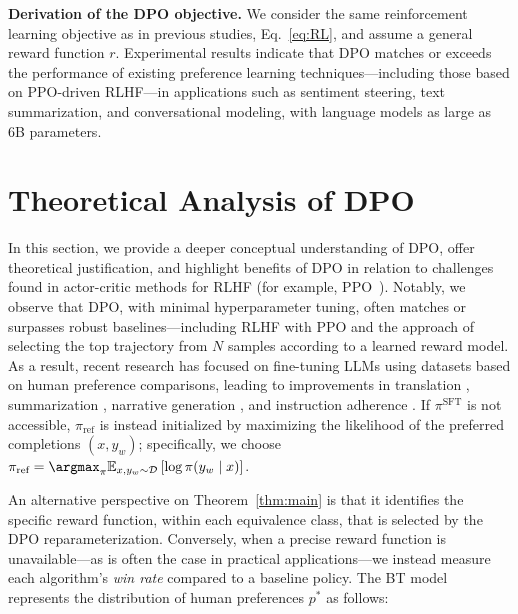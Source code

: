 \begin{lemma}
\begin{sproof}
\textbf{Derivation of the DPO objective.} We consider the same reinforcement learning objective as in previous studies, Eq.~\ref{eq:RL}, and assume a general reward function $r$. Experimental results indicate that DPO matches or exceeds the performance of existing preference learning techniques—including those based on PPO-driven RLHF—in applications such as sentiment steering, text summarization, and conversational modeling, with language models as large as 6B parameters. \section{Theoretical Analysis of DPO} In this section, we provide a deeper conceptual understanding of DPO, offer theoretical justification, and highlight benefits of DPO in relation to challenges found in actor-critic methods for RLHF (for example, PPO~\cite{schulman2017proximal}). Notably, we observe that DPO, with minimal hyperparameter tuning, often matches or surpasses robust baselines—including RLHF with PPO and the approach of selecting the top trajectory from $N$ samples according to a learned reward model. As a result, recent research has focused on fine-tuning LLMs using datasets based on human preference comparisons, leading to improvements in translation \citep{kreutzer-etal-2018-reliability}, summarization \citep{stiennon2022learning,ziegler2020finetuning}, narrative generation \citep{ziegler2020finetuning}, and instruction adherence \citep{ouyang2022training,ramamurthy2023is}. If $\pi^\text{SFT}$ is not accessible, $\pi_\text{ref}$ is instead initialized by maximizing the likelihood of the preferred completions $(x, y_w)$; specifically, we choose ${\pi_\text{ref} = \argmax_{\pi}\mathbb{E}_{x, y_w \sim \mathcal{D}}\left[\log \pi(y_w \mid x)\right]}$. \end{sproof}

An alternative perspective on Theorem~\ref{thm:main} is that it identifies the specific reward function, within each equivalence class, that is selected by the DPO reparameterization. Conversely, when a precise reward function is unavailable—as is often the case in practical applications—we instead measure each algorithm's \textit{win rate} compared to a baseline policy. The BT model represents the distribution of human preferences $p^*$ as follows:


\end{lemma}

